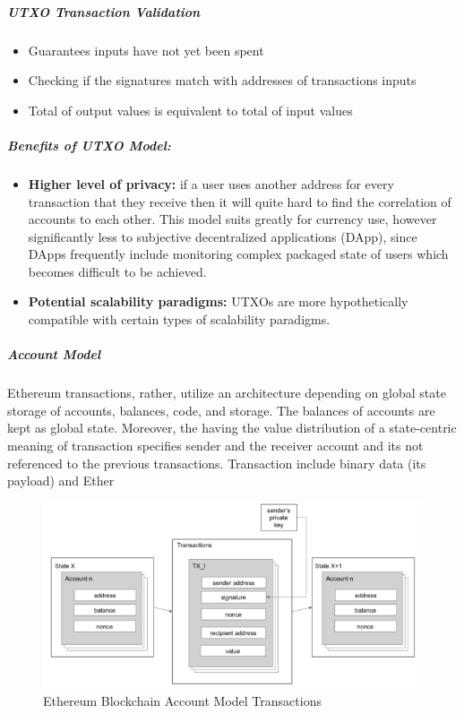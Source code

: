 \subparagraph{UTXO Transaction Validation}
\begin{itemize}
\item Guarantees inputs have not yet been spent 
\item Checking if the signatures match with addresses of transactions inputs 
\item Total of output values is equivalent to total of input values 
\end{itemize}


\subparagraph{Benefits of UTXO Model:}
\begin{itemize}
\item \textbf{Higher level of privacy:} if a user uses another address for every transaction that they receive then it will quite hard to find the correlation of accounts to each other. This model suits greatly for currency use, however significantly less to subjective decentralized applications (DApp), since DApps frequently include monitoring complex packaged state of users which becomes difficult to be achieved.  
\item \textbf{Potential scalability paradigms:} UTXOs are more hypothetically compatible with certain types of scalability paradigms.
\end{itemize}

\subparagraph{Account Model}

Ethereum transactions, rather, utilize an architecture depending on global state storage of accounts, balances, code, and storage. The balances of accounts are kept as global state. Moreover, the having the value distribution of a state-centric meaning of transaction specifies sender and the receiver account and its not referenced to the previous transactions. Transaction include binary data (its payload) and Ether

\begin{figure}[h]
\centering
\includegraphics[width=1.0\textwidth]{images/account_model.png}
\caption{\label{fig:account_model}Ethereum Blockchain Account Model Transactions}
\end{figure}


